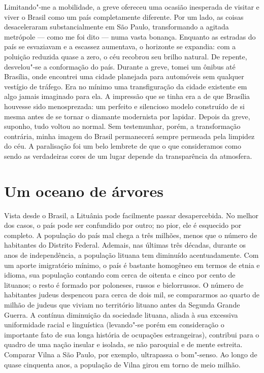 Limitando"-me a
mobilidade, a greve ofereceu uma ocasião inesperada de visitar e viver o
Brasil como um país completamente diferente. Por um lado, as coisas
desaceleraram substancialmente em São Paulo, transformando a agitada
metrópole --- como me foi dito --- numa vasta bonança. Enquanto as estradas
do país se esvaziavam e a escassez aumentava, o horizonte se expandia:
com a poluição reduzida quase a zero, o céu recobrou seu brilho natural.
De repente, desvelou"-se a conformação do país. Durante a greve, tomei um
ônibus até Brasília, onde encontrei uma cidade planejada para automóveis
sem qualquer vestígio de tráfego. Era no mínimo uma transfiguração da
cidade existente em algo jamais imaginado para ela. A impressão que se
tinha era a de que Brasília houvesse sido menosprezada: um perfeito e
silencioso modelo construído de si mesma antes de se tornar o diamante
modernista por lapidar. Depois da greve, suponho, tudo voltou ao normal.
Sem testemunhar, porém, a transformação contrária, minha imagem do
Brasil permanecerá sempre permeada pela limpidez do céu. A paralisação
foi um belo lembrete de que o que consideramos como sendo as verdadeiras
cores de um lugar depende da transparência da atmosfera.

\section*{Um oceano de árvores}

Vista desde o Brasil, a Lituânia pode facilmente passar desapercebida.
No melhor dos casos, o país pode ser confundido por outro; no pior, ele
é esquecido por completo. A população do país mal chega a três milhões,
menos que o número de habitantes do Distrito Federal. Ademais, nas
últimas três décadas, durante os anos de independência, a população
lituana tem diminuído acentuadamente. Com um aporte imigratório mínimo,
o país é bastante homogêneo em termos de etnia e idioma, sua população
contando com cerca de oitenta e cinco por cento de lituanos; o resto é
formado por poloneses, russos e bielorrussos. O número de habitantes
judeus despencou para cerca de dois mil, se compararmos ao quarto de
milhão de judeus que viviam no território lituano antes da Segunda
Grande Guerra. A contínua diminuição da sociedade lituana, aliada à sua
excessiva uniformidade racial e linguística (levando"-se porém em
consideração o importante fato de sua longa história de ocupações
estrangeiras), contribui para o quadro de uma nação insular e isolada,
se não paroquial e de mente estreita. Comparar Vilna a São Paulo, por
exemplo, ultrapassa o bom"-senso. Ao longo de quase cinquenta anos, a
população de Vilna girou em torno de meio milhão. 

